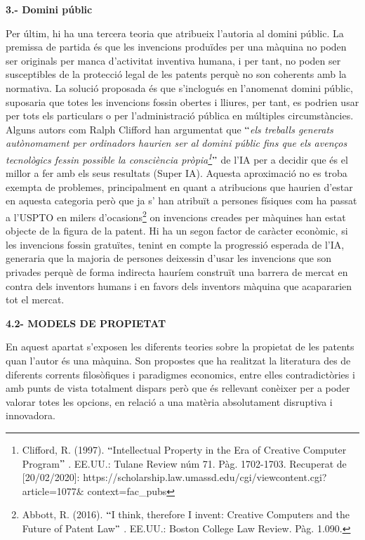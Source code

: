 \documentclass[12pt]{article}
\begin{document}
\vspace{\baselineskip}
\textbf{3.- Domini públic}\par


\vspace{\baselineskip}
Per últim, hi ha una tercera teoria que atribueix l’autoria al domini públic. La premissa de partida és que les invencions produïdes per una màquina no poden ser originals per manca d’activitat inventiva humana, i per tant, no poden ser susceptibles de la protecció legal de les patents perquè no son coherents amb la normativa. La solució proposada és que s’inclogués en l’anomenat domini públic, suposaria que totes les invencions fossin obertes i lliures, per tant, es podrien usar per tots els particulars o per l’administració pública en múltiples circumstàncies. Alguns autors com Ralph Clifford han argumentat que $``$\textit{els treballs generats autònomament per ordinadors haurien ser al domini públic fins que els avenços tecnològics fessin possible la consciència pròpia\footnote{ Clifford, R. (1997). $``$Intellectual Property in the Era of Creative Computer Program$"$ . EE.UU.: Tulane Review núm 71. Pàg. 1702-1703. Recuperat de [20/02/2020]: https://scholarship.law.umassd.edu/cgi/viewcontent.cgi?article=1077$\&$ context=fac\_pubs }$"$  }de l’IA per a decidir que és el millor a fer amb els seus resultats (Super IA). Aquesta aproximació no es troba exempta de problemes, principalment en quant a atribucions que haurien d’estar en aquesta categoria però que ja s’ han atribuït  a persones físiques com ha passat a l’USPTO en milers d’ocasions\footnote{Abbott, R. (2016). $``$I think, therefore I invent: Creative Computers and the Future of Patent Law$"$ . EE.UU.: Boston College Law Review. Pàg. 1.090. } on invencions creades per màquines han estat objecte de la figura de la patent. Hi ha un segon factor de caràcter econòmic, si les invencions fossin gratuïtes, tenint en compte la progressió esperada de l’IA, generaria que la majoria de persones deixessin d’usar les invencions que son privades perquè de forma indirecta hauríem construït una barrera de mercat en contra dels inventors humans i en favors dels inventors màquina que acapararien tot el mercat.\par

\textbf{4.2- MODELS DE PROPIETAT}\par


\vspace{\baselineskip}
\begin{justify}
En aquest apartat s’exposen les diferents teories sobre la propietat de les patents quan l’autor és una màquina. Son propostes que ha realitzat la literatura des de diferents corrents filosòfiques i paradigmes economics, entre elles contradictòries i amb punts de vista totalment dispars però que és rellevant conèixer per a poder valorar totes les opcions,  en relació a una matèria absolutament disruptiva i innovadora. 
\end{justify}\par
\end{document}
